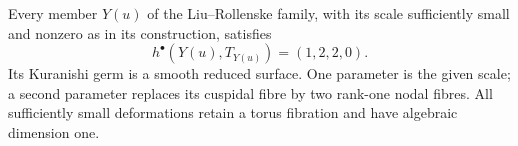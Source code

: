 \begin{proposition}\hypertarget{tag-01GL}{}\label{cdp:st:E14}

Every member $Y(u)$ of the Liu--Rollenske family, with its scale
sufficiently small and nonzero as in its construction, satisfies
\[
 h^\bullet(Y(u),T_{Y(u)})=(1,2,2,0).
\]
Its Kuranishi germ is a smooth reduced surface. One parameter is
the given scale; a second parameter replaces its cuspidal fibre by
two rank-one nodal fibres. All sufficiently small deformations
retain a torus fibration and have algebraic dimension one.
\end{proposition}


